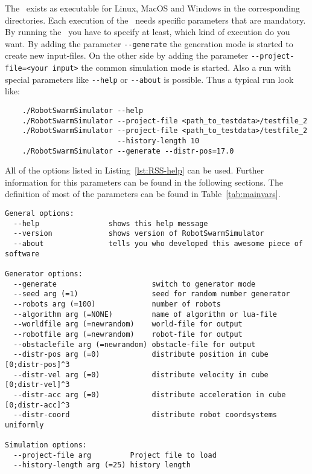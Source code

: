 \documentclass[a4paper,halfparskip,11pt,twoside]{scrartcl}
\begin{document}
The \RSS\ exists as executable for Linux, MacOS and Windows in the corresponding directories. Each execution of the \RSS\ needs specific parameters that are mandatory. By running the \RSS\ you have to specify at least, which kind of execution do you want. By adding the parameter {\tt -{}-generate} the generation mode is started to create new input-files. On the other side by adding the parameter {\tt -{}-project-file=<your input>} the common simulation mode is started. Also a run with special parameters like {\tt-{}-help} or {\tt-{}-about} is possible. Thus a typical run look like:
\begin{verbatim}
    ./RobotSwarmSimulator --help
    ./RobotSwarmSimulator --project-file <path_to_testdata>/testfile_2
    ./RobotSwarmSimulator --project-file <path_to_testdata>/testfile_2 
                          --history-length 10
    ./RobotSwarmSimulator --generate --distr-pos=17.0
\end{verbatim}

All of the options listed in Listing~\ref{lst:RSS-help} can be used. Further information for this parameters can be found in the following sections. The definition of most of the parameters can be found in Table~\ref{tab:mainvars}.

\begin{lstlisting}[caption={RSS Helpline},label=lst:RSS-help]
General options:
  --help                shows this help message
  --version             shows version of RobotSwarmSimulator
  --about               tells you who developed this awesome piece of software

Generator options:
  --generate                      switch to generator mode
  --seed arg (=1)                 seed for random number generator
  --robots arg (=100)             number of robots
  --algorithm arg (=NONE)         name of algorithm or lua-file
  --worldfile arg (=newrandom)    world-file for output
  --robotfile arg (=newrandom)    robot-file for output
  --obstaclefile arg (=newrandom) obstacle-file for output
  --distr-pos arg (=0)            distribute position in cube [0;distr-pos]^3
  --distr-vel arg (=0)            distribute velocity in cube [0;distr-vel]^3
  --distr-acc arg (=0)            distribute acceleration in cube [0;distr-acc]^3
  --distr-coord                   distribute robot coordsystems uniformly

Simulation options:
  --project-file arg         Project file to load
  --history-length arg (=25) history length
\end{lstlisting}
\end{document}
